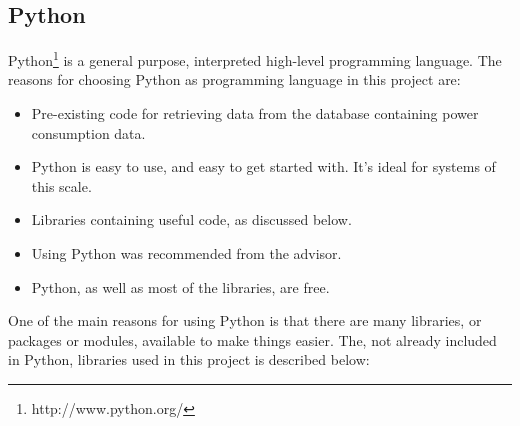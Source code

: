 \documentclass[12pt]{article}
\begin{document}
		
	
	\subsection{Python}
		\label{sec:python}
		Python\footnote{http://www.python.org/} is a general purpose, interpreted high-level programming language. The reasons for choosing Python as programming language in this project are:
		
		\begin{itemize}
			\item Pre-existing code for retrieving data from the database containing power consumption data. 
			\item Python is easy to use, and easy to get started with. It's ideal for systems of this scale.
			\item Libraries containing useful code, as discussed below. 
			\item Using Python was recommended from the advisor. 
			\item Python, as well as most of the libraries, are free.
		\end{itemize}
		
		One of the main reasons for using Python is that there are many libraries, or packages or modules, available to make things easier. The, not already included in Python, libraries  used in this project is described below:
		
\end{document}
